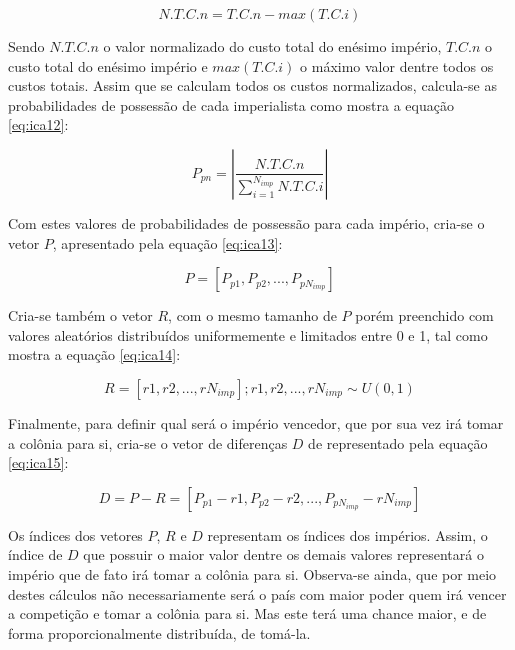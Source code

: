 \begin{equation} 
\label{eq:ica11}
N.T.C.n = T.C.n - max(T.C.i)
\end{equation}

Sendo \(N.T.C.n\) o valor normalizado do custo total do enésimo império, \(T.C.n\) o custo total do enésimo império e \(max(T.C.i)\) o máximo valor dentre todos os custos totais. Assim que se calculam todos os custos normalizados, calcula-se as probabilidades de possessão de cada imperialista como mostra a equação \ref{eq:ica12}:

\begin{equation} 
\label{eq:ica12}
P_{pn} = \left| \frac{N.T.C.n}{\sum_{i=1}^{N_{imp}}N.T.C.i} \right| 
\end{equation}

Com estes valores de probabilidades de possessão para cada império, cria-se o vetor \(P\), apresentado pela equação \ref{eq:ica13}:

\begin{equation} 
\label{eq:ica13}
P = [P_{p1}, P_{p2}, ..., P_{pN_{imp}}] 
\end{equation}

Cria-se também o vetor \(R\), com o mesmo tamanho de \(P\) porém preenchido com valores aleatórios distribuídos uniformemente e limitados entre 0 e 1, tal como mostra a equação \ref{eq:ica14}:

\begin{equation} 
\label{eq:ica14}
R = [r1, r2, ..., rN_{imp}]; r1, r2,..., rN_{imp} \sim  U(0,1)  
\end{equation}

Finalmente, para definir qual será o império vencedor, que por sua vez irá tomar a colônia para si, cria-se o vetor de diferenças \(D\) de representado pela equação \ref{eq:ica15}:

\begin{equation} 
\label{eq:ica15}
D = P - R = [P_{p1}-r1, P_{p2}-r2, ..., P_{pN_{imp}}-rN_{imp}] 
\end{equation}

Os índices dos vetores \(P\), \(R\) e \(D\) representam os índices dos impérios. Assim, o índice de \(D\) que possuir o maior valor dentre os demais valores representará o império que de fato irá tomar a colônia para si. Observa-se ainda, que por meio destes cálculos não necessariamente será o país com maior poder quem irá vencer a competição e tomar a colônia para si. Mas este terá uma chance maior, e de forma proporcionalmente distribuída, de tomá-la.  

